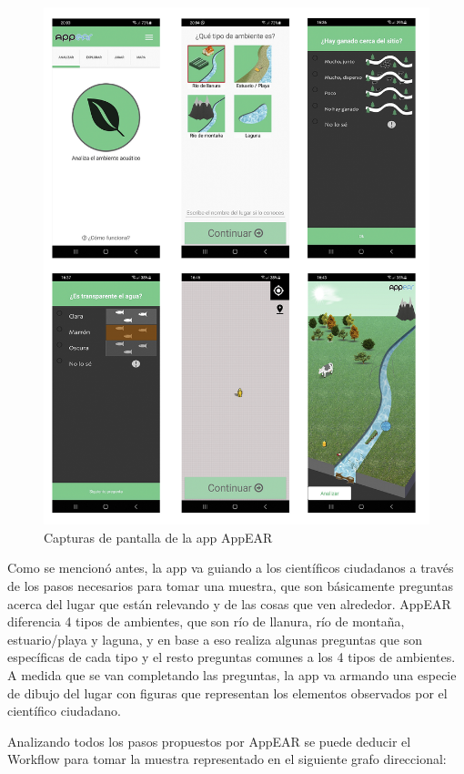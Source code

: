 \begin{figure}[H]
  \centering
   \includegraphics[scale=0.5]{06-caso_de_uso/capturas_appear.png} 
    \caption{Capturas de pantalla de la app AppEAR}
\end{figure}

Como se mencionó antes, la app va guiando a los científicos ciudadanos a través de los pasos necesarios para tomar una muestra, que son básicamente preguntas acerca del lugar que están relevando y de las cosas que ven alrededor. AppEAR diferencia 4 tipos de ambientes, que son río de llanura, río de montaña, estuario/playa y laguna, y en base a eso realiza algunas preguntas que son específicas de cada tipo y el resto preguntas comunes a los 4 tipos de ambientes. A medida que se van completando las preguntas, la app va armando una especie de dibujo del lugar con figuras que representan los elementos observados por el científico ciudadano.

Analizando todos los pasos propuestos por AppEAR se puede deducir el Workflow para tomar la muestra representado en el siguiente grafo direccional:

